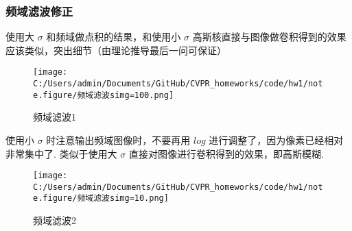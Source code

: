 \documentclass[12pt, a4paper, oneside]{ctexart}
\begin{document}
\subsubsection*{频域滤波修正}

使用大 \(\sigma\) 和频域做点积的结果，和使用小 \(\sigma\)
高斯核直接与图像做卷积得到的效果应该类似，突出细节（由理论推导最后一问可保证）

\begin{figure}[htbp]
    \centering
    \texttt{[image: C:/Users/admin/Documents/GitHub/CVPR\_homeworks/code/hw1/note.figure/频域滤波simg=100.png]}
    \caption{频域滤波1}
\end{figure}

使用小 \(\sigma\) 时注意输出频域图像时，不要再用 \(log\)
进行调整了，因为像素已经相对非常集中了. 类似于使用大 \(\sigma\)
直接对图像进行卷积得到的效果，即高斯模糊.

\begin{figure}[htbp]
    \centering
    \texttt{[image: C:/Users/admin/Documents/GitHub/CVPR\_homeworks/code/hw1/note.figure/频域滤波simg=10.png]}
    \caption{频域滤波2}
\end{figure}
\end{document}
